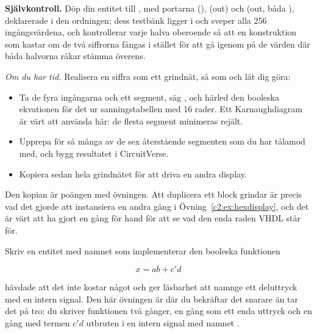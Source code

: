 
\begin{selfcheck}
\textbf{Självkontroll.} Döp din entitet till , med portarna 
(),  (out) och  (out, båda
), deklarerade i den ordningen; dess testbänk ligger i
 och sveper alla 256 ingångsvärdena, och kontrollerar varje halva
oberoende så att en konstruktion som kastar om de två siffrorna fångas i stället för att gå igenom
på de värden där båda halvorna råkar stämma överens.
\end{selfcheck}

\label{c2:ex:segments}
\emph{Om du har tid.} Realisera en siffra som ett grindnät, så som  och
 lät dig göra:
\begin{itemize}
  \item Ta de fyra ingångarna och ett segment, säg , och härled den booleska ekvationen
    för det ur sanningstabellen med 16 rader. Ett Karnaughdiagram är värt att använda här: de
    flesta segment minimeras rejält.
  \item Upprepa för så många av de sex återstående segmenten som du har tålamod med, och bygg
    resultatet i CircuitVerse.
  \item Kopiera sedan hela grindnätet för att driva en andra display.
\end{itemize}

Den kopian är poängen med övningen. Att duplicera ett block grindar är precis vad det gjorde att
instansiera  en andra gång i Övning~\ref{c2:ex:hexdisplay}, och det är värt att ha
gjort en gång för hand för att se vad den enda raden VHDL står för.


\label{c2:ex:combo}
Skriv en entitet med namnet  som implementerar den booleska funktionen

\[ x = ab + c'd \]

 hävdade att det inte kostar något och ger läsbarhet att namnge ett
deluttryck med en intern signal. Den här övningen är där du bekräftar det snarare än tar det på
tro: du skriver funktionen två gånger, en gång som ett enda uttryck och en gång med termen $c'd$
utbruten i en intern signal med namnet .


